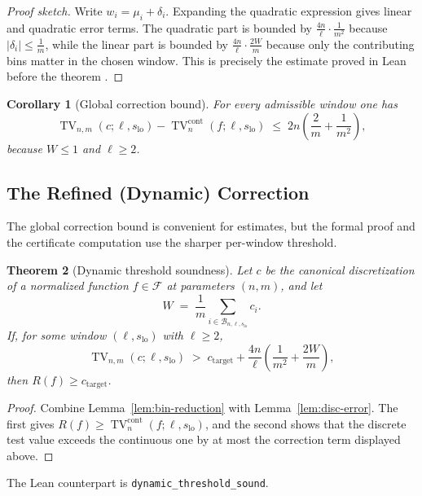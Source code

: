 \documentclass[11pt, letterpaper]{article}
\theoremstyle{paperplain}
\newtheorem{theorem}{Theorem}[section]
\newtheorem{corollary}[theorem]{Corollary}
\theoremstyle{paperdef}
\begin{document}
\begin{proof}[Proof sketch]
Write $w_i=\mu_i+\delta_i$.  Expanding the quadratic expression gives
linear and quadratic error terms.  The quadratic part is bounded by
$\tfrac{4n}{\ell}\cdot\tfrac{1}{m^2}$ because
$|\delta_i|\le \tfrac{1}{m}$, while the linear part is bounded by
$\tfrac{4n}{\ell}\cdot \tfrac{2W}{m}$ because only the contributing
bins matter in the chosen window.  This is precisely the estimate
proved in Lean before the theorem
.
\end{proof}

\begin{corollary}[Global correction bound]
For every admissible window one has
\[
  \operatorname{TV}_{n,m}(c;\ell,s_{\mathrm{lo}})
  -
  \operatorname{TV}^{\mathrm{cont}}_n(f;\ell,s_{\mathrm{lo}})
  \;\le\;
  2n\left(\frac{2}{m}+\frac{1}{m^2}\right),
\]
because $W\le 1$ and $\ell\ge 2$.
\end{corollary}

\subsection{The Refined (Dynamic) Correction}

The global correction bound is convenient for estimates, but the formal
proof and the certificate computation use the sharper per-window
threshold.

\begin{theorem}[Dynamic threshold soundness]
\label{lem:dynamic-correction}
Let $c$ be the canonical discretization of a normalized function
$f\in\mathcal{F}$ at parameters $(n,m)$, and let
\[
  W
  \;=\;
  \frac{1}{m}
  \sum_{i\in \mathcal{B}_{n,\ell,s_{\mathrm{lo}}}} c_i.
\]
If, for some window $(\ell,s_{\mathrm{lo}})$ with $\ell\ge 2$,
\[
  \operatorname{TV}_{n,m}(c;\ell,s_{\mathrm{lo}})
  \;>\;
  c_{\mathrm{target}}
  +
  \frac{4n}{\ell}
  \left(
    \frac{1}{m^2} + \frac{2W}{m}
  \right),
\]
then $R(f)\ge c_{\mathrm{target}}$.
\end{theorem}

\begin{proof}
Combine Lemma~\ref{lem:bin-reduction} with
Lemma~\ref{lem:disc-error}.  The first gives
$R(f)\ge \operatorname{TV}^{\mathrm{cont}}_n(f;\ell,s_{\mathrm{lo}})$,
and the second shows that the discrete test value exceeds the
continuous one by at most the correction term displayed above.
\end{proof}

The Lean counterpart is \texttt{dynamic\_threshold\_sound}.
\end{document}
